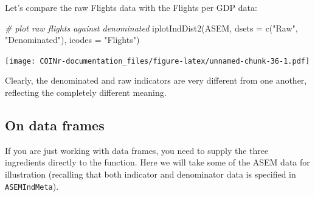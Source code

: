 \documentclass[
]{book}
\newenvironment{Shaded}{\begin{snugshade}}{\end{snugshade}}
\newcommand{\AttributeTok}[1]{\textcolor[rgb]{0.77,0.63,0.00}{#1}}
\newcommand{\CommentTok}[1]{\textcolor[rgb]{0.56,0.35,0.01}{\textit{#1}}}
\newcommand{\FunctionTok}[1]{\textcolor[rgb]{0.00,0.00,0.00}{#1}}
\newcommand{\NormalTok}[1]{#1}
\newcommand{\StringTok}[1]{\textcolor[rgb]{0.31,0.60,0.02}{#1}}
\begin{document}
Let's compare the raw Flights data with the Flights per GDP data:

\begin{Shaded}
\begin{Highlighting}[]
\CommentTok{\# plot raw flights against denominated}
\FunctionTok{iplotIndDist2}\NormalTok{(ASEM, }\AttributeTok{dsets =} \FunctionTok{c}\NormalTok{(}\StringTok{"Raw"}\NormalTok{, }\StringTok{"Denominated"}\NormalTok{), }\AttributeTok{icodes =} \StringTok{"Flights"}\NormalTok{)}
\end{Highlighting}
\end{Shaded}

\texttt{[image: COINr-documentation\_files/figure-latex/unnamed-chunk-36-1.pdf]}

Clearly, the denominated and raw indicators are very different from one another, reflecting the completely different meaning.

\hypertarget{on-data-frames}{%
\subsection{On data frames}\label{on-data-frames}}

If you are just working with data frames, you need to supply the three ingredients directly to the function. Here we will take some of the ASEM data for illustration (recalling that both indicator and denominator data is specified in \texttt{ASEMIndMeta}).
\end{document}
